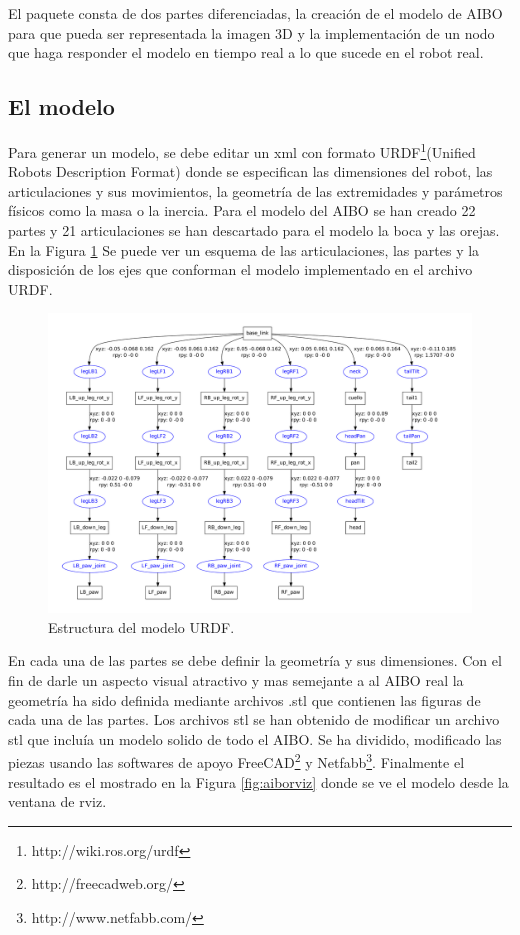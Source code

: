 \documentclass[12pt,a4paper,final,twoside]{book}
\begin{document}
El paquete consta de dos partes diferenciadas, la creación de el modelo de AIBO para que pueda ser representada la imagen 3D y la implementación de un nodo que haga responder el modelo en tiempo real a lo que sucede en el robot real.

\subsection{El modelo}
Para generar un modelo, se debe editar un xml con formato URDF\footnote{http://wiki.ros.org/urdf}(Unified Robots Description Format) donde se especifican las dimensiones del robot, las articulaciones y sus movimientos, la geometría de las extremidades y parámetros físicos como la masa o la inercia.
Para el modelo del AIBO se han creado 22 partes y 21 articulaciones se han descartado para el modelo la boca y las orejas. En la Figura \ref{fig:aibourdf} Se puede ver un esquema de las articulaciones, las partes y la disposición de los ejes que conforman el modelo implementado en el archivo URDF.

\begin{figure}[H]
	\centering
    \includegraphics[scale=0.39]{images/Aibo.pdf}
	 \caption{Estructura del modelo URDF.}
  \label{fig:aibourdf}
\end{figure}

En  cada una de las partes se debe definir la geometría y sus dimensiones. Con el fin de darle un aspecto visual atractivo y mas semejante a al AIBO real la geometría ha sido  definida mediante archivos .stl que contienen las figuras de cada una de las partes. Los archivos stl se han obtenido de modificar un archivo stl que incluía un modelo solido de todo el AIBO. Se ha dividido, modificado las piezas usando las softwares de apoyo FreeCAD\footnote{http://freecadweb.org/} y Netfabb\footnote{http://www.netfabb.com/}. Finalmente el resultado es el mostrado en la Figura \ref{fig:aiborviz} donde se ve el modelo desde la ventana de rviz.
 
\end{document}
